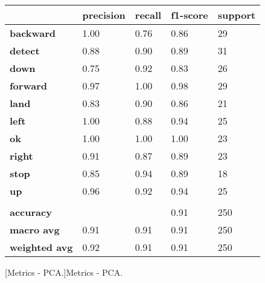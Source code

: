 \begin{table}[H]
	\centering
    \begin{tabular}{|l|l|l|l|l|}
        \hline
        \textbf{}             & \textbf{precision} & \textbf{recall} & \textbf{f1-score} & \textbf{support} \\ \hline
        \textbf{backward}     & 1.00               & 0.76            & 0.86              & 29               \\ \hline
        \textbf{detect}       & 0.88               & 0.90            & 0.89              & 31               \\ \hline
        \textbf{down}         & 0.75               & 0.92            & 0.83              & 26               \\ \hline
        \textbf{forward}      & 0.97               & 1.00            & 0.98              & 29               \\ \hline
        \textbf{land}         & 0.83               & 0.90            & 0.86              & 21               \\ \hline
        \textbf{left}         & 1.00               & 0.88            & 0.94              & 25               \\ \hline
        \textbf{ok}           & 1.00               & 1.00            & 1.00              & 23               \\ \hline
        \textbf{right}        & 0.91               & 0.87            & 0.89              & 23               \\ \hline
        \textbf{stop}         & 0.85               & 0.94            & 0.89              & 18               \\ \hline
        \textbf{up}           & 0.96               & 0.92            & 0.94              & 25               \\ \hline
                              &                    &                 &                   &                  \\ \hline
        \textbf{accuracy}     &                    &                 & 0.91              & 250              \\ \hline
        \textbf{macro avg}    & 0.91               & 0.91            & 0.91              & 250              \\ \hline
        \textbf{weighted avg} & 0.92               & 0.91            & 0.91              & 250              \\ \hline
        \end{tabular}
	[Metrics - PCA.]{Metrics - PCA.}
    \label{tab:pca}
\end{table}

